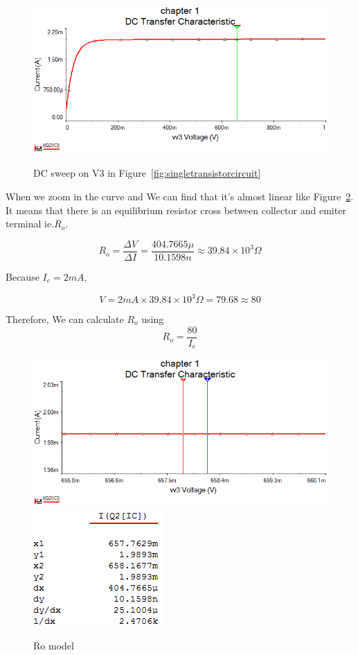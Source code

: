 \begin{figure}[htbp]
	\centering
	\includegraphics[scale=0.6]{"../Photo/Chap1/DC sweep on Batterty"}\\[0.5cm]
	\caption{DC sweep on V3 in Figure~\ref{fig:singletransistorcircuit} }
	\label{fig: DC sweep curve}
\end{figure}

When we zoom in the curve and We can find that it's almost linear like Figure~\ref{fig: Ro model}. It means that there is an equilibrium resistor cross between collector and emiter terminal ie.$R_o$.

\[ R_o= \frac{\Delta V}{\Delta I}= \frac{404.7665 \mu}{10.1598 n} \approx 39.84\times10^3  \Omega \] 

Because $I_e = 2mA $,

\[ V = 2mA \times 39.84\times10^3 \Omega=  79.68 \approx 80 \]

Therefore, We can calculate $R_o$ using 
\begin{equation}
	R_o = \frac{80}{I_e} 
\end{equation}


\begin{figure}[htbp]
	\centering
	\includegraphics[scale=0.6]{"../Photo/Chap1/DC sweep curve"}\\[0.5cm]
	\includegraphics[scale=0.8]{"../Photo/Chap1/DC sweep data"}
	\caption{Ro model }
	\label{fig: Ro model}
\end{figure}




